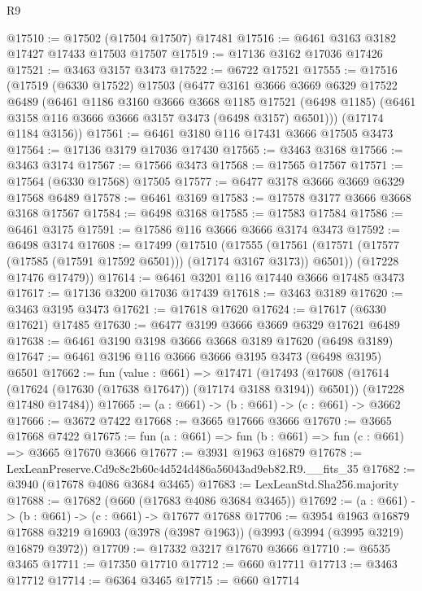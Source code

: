 \begin{lexlean}{R9}
\begin{coremodule}
@17510 := @17502 (@17504 @17507) @17481
@17516 := @6461 @3163 @3182 @17427 @17433 @17503 @17507
@17519 := @17136 @3162 @17036 @17426
@17521 := @3463 @3157 @3473
@17522 := @6722 @17521
@17555 := @17516
    (@17519
      (@6330 @17522)
      @17503
      (@6477
        @3161
        @3666
        @3669
        @6329
        @17522
        @6489
        (@6461
          @1186
          @3160
          @3666
          @3668
          @1185
          @17521
          (@6498 @1185)
          (@6461 @3158 @116 @3666 @3666 @3157 @3473 (@6498 @3157) @6501)))
      (@17174 @1184 @3156))
@17561 := @6461 @3180 @116 @17431 @3666 @17505 @3473
@17564 := @17136 @3179 @17036 @17430
@17565 := @3463 @3168
@17566 := @3463 @3174
@17567 := @17566 @3473
@17568 := @17565 @17567
@17571 := @17564 (@6330 @17568) @17505
@17577 := @6477 @3178 @3666 @3669 @6329 @17568 @6489
@17578 := @6461 @3169
@17583 := @17578 @3177 @3666 @3668 @3168 @17567
@17584 := @6498 @3168
@17585 := @17583 @17584
@17586 := @6461 @3175
@17591 := @17586 @116 @3666 @3666 @3174 @3473
@17592 := @6498 @3174
@17608 := @17499
    (@17510
      (@17555 (@17561 (@17571 (@17577 (@17585 (@17591 @17592 @6501))) (@17174 @3167 @3173)) @6501))
      (@17228 @17476 @17479))
@17614 := @6461 @3201 @116 @17440 @3666 @17485 @3473
@17617 := @17136 @3200 @17036 @17439
@17618 := @3463 @3189
@17620 := @3463 @3195 @3473
@17621 := @17618 @17620
@17624 := @17617 (@6330 @17621) @17485
@17630 := @6477 @3199 @3666 @3669 @6329 @17621 @6489
@17638 := @6461 @3190 @3198 @3666 @3668 @3189 @17620 (@6498 @3189)
@17647 := @6461 @3196 @116 @3666 @3666 @3195 @3473 (@6498 @3195) @6501
@17662 := fun (value : @661) =>
  @17471
    (@17493
      (@17608 (@17614 (@17624 (@17630 (@17638 @17647)) (@17174 @3188 @3194)) @6501))
      (@17228 @17480 @17484))
@17665 := (a : @661) -> (b : @661) -> (c : @661) -> @3662
@17666 := @3672 @7422
@17668 := @3665 @17666 @3666
@17670 := @3665 @17668 @7422
@17675 := fun (a : @661) => fun (b : @661) => fun (c : @661) => @3665 @17670 @3666
@17677 := @3931 @1963 @16879
@17678 := LexLeanPreserve.Cd9c8c2b60c4d524d486a56043ad9eb82.R9.__fits_35
@17682 := @3940 (@17678 @4086 @3684 @3465)
@17683 := LexLeanStd.Sha256.majority
@17688 := @17682 (@660 (@17683 @4086 @3684 @3465))
@17692 := (a : @661) -> (b : @661) -> (c : @661) -> @17677 @17688
@17706 := @3954
    @1963
    @16879
    @17688
    @3219
    @16903
    (@3978 (@3987 @1963))
    (@3993 (@3994 (@3995 @3219) @16879 @3972))
@17709 := @17332 @3217 @17670 @3666
@17710 := @6535 @3465
@17711 := @17350 @17710
@17712 := @660 @17711
@17713 := @3463 @17712
@17714 := @6364 @3465
@17715 := @660 @17714

\end{coremodule}
\end{lexlean}
